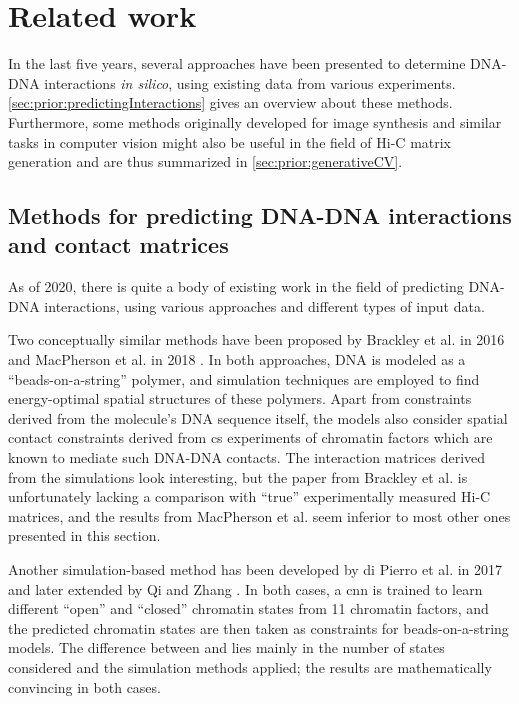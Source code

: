 \section{Related work}
In the last five years, several approaches have been presented to determine DNA-DNA interactions \emph{in silico}, 
using existing data from various experiments. \autoref{sec:prior:predictingInteractions} gives an overview about these methods.
Furthermore, some methods originally developed for image synthesis and similar tasks in computer vision might also be useful 
in the field of Hi-C matrix generation and are thus summarized in \autoref{sec:prior:generativeCV}.

\subsection{Methods for predicting DNA-DNA interactions and contact matrices} \label{sec:prior:predictingInteractions}
As of 2020, there is quite a body of existing work in the field of predicting DNA-DNA interactions, 
using various approaches and different types of input data.

Two conceptually similar methods have been proposed by Brackley et al. in 2016 and MacPherson et al. in 2018 \cite{Brackley2016, MacPherson2018}.
In both approaches, DNA is modeled as a ``beads-on-a-string'' polymer, and simulation techniques are employed to
find energy-optimal spatial structures of these polymers.
Apart from constraints derived from the molecule's DNA sequence itself, the models also consider spatial contact constraints derived from \acrshort{cs} experiments
of chromatin factors which are known to mediate such DNA-DNA contacts.
The interaction matrices derived from the simulations look interesting, 
but the paper from Brackley et al. \cite{Brackley2016} is unfortunately lacking a comparison with ``true'' experimentally measured Hi-C matrices, 
and the results from MacPherson et al. \cite{MacPherson2018} seem inferior to most other ones presented in this section.

Another simulation-based method has been developed by di Pierro et al. in 2017 \cite{Pierro2017} and later extended by Qi and Zhang \cite{Qi2019}. 
In both cases, a \acrfull{cnn} is trained to learn different ``open'' and ``closed'' chromatin states from 11 chromatin factors, 
and the predicted chromatin states are then taken as constraints for beads-on-a-string models.
The difference between \cite{Pierro2017} and \cite{Qi2019} lies mainly in the number of states considered and the simulation methods applied;
the results are mathematically convincing in both cases.

